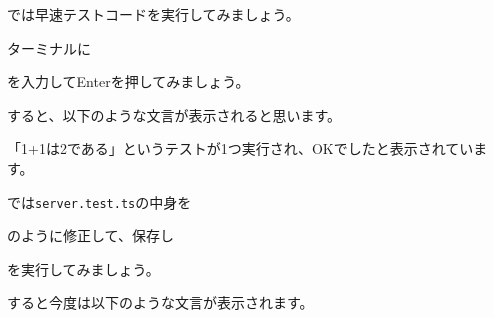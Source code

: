 では早速テストコードを実行してみましょう。

ターミナルに

\begin{Shaded}
\begin{Highlighting}[]
\end{Highlighting}
\end{Shaded}

を入力してEnterを押してみましょう。

すると、以下のような文言が表示されると思います。

\begin{Shaded}
\begin{Highlighting}[]

\end{Highlighting}
\end{Shaded}

「1+1は2である」というテストが1つ実行され、OKでしたと表示されています。

では\texttt{server.test.ts}の中身を

\begin{Shaded}
\begin{Highlighting}[]
\NormalTok{(} \OperatorTok{+} \OperatorTok{,} \NormalTok{)}\OperatorTok{;}


\NormalTok{(} \OperatorTok{+} \OperatorTok{,} \NormalTok{)}\OperatorTok{;} 
\end{Highlighting}
\end{Shaded}

のように修正して、保存し

\begin{Shaded}
\begin{Highlighting}[]
\end{Highlighting}
\end{Shaded}

を実行してみましょう。

すると今度は以下のような文言が表示されます。

